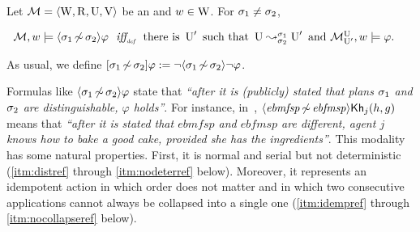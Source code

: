 \medskip


\medskip

\begin{definition}\label{def:ref-sem}
Let $\mathcal{M}=\langle \operatorname{W},\operatorname{R},\operatorname{U},\operatorname{V} \rangle$ be an \ults and $w \in \operatorname{W}$.
For $\sigma_1\neq\sigma_2$,
\begin{spcenter}
$\begin{array}{l@{\ \ }c@{\ \ }l}
\modults,w\models \refdiam{\plan_1}{\plan_2}\varphi & \iffdef & \text{there is } \Unc' \text{ such that } \splitstr{\Unc}{\Unc'}{\plan_1}{\plan_2} \text{ and }  \modults^{\Unc}_{\Unc'},w \models \varphi.
\end{array}$
\end{spcenter}
As usual, we define $[{\sigma_1{\,\not\sim\,}\sigma_2}]\varphi := \lnot \langle \sigma_1{\,\not\sim\,}\sigma_2 \rangle\lnot\varphi$.
\end{definition}

\medskip

Formulas like $\langle \sigma_1{\,\not\sim\,}\sigma_2 \rangle\varphi$ state that \emph{``after it is (publicly) stated that plans $\sigma_1$ and $\sigma_2$ are distinguishable, $\varphi$ holds''}. For instance, in~, $\langle \mathit{ebmfsp}{\,\not\sim\,}\mathit{ebfmsp} \rangle{\sf Kh}_j(h,g)$ means that \emph{``after it is stated that $\mathit{ebmfsp}$ and $\mathit{ebfmsp}$ are different, agent $j$ knows how to bake a good cake, provided she has the ingredients''}. This modality has some natural properties. First, it is normal and serial but not deterministic (\ref{itm:distref} through \ref{itm:nodeterref} below). Moreover, it represents an idempotent action in which order does not matter and in which two consecutive applications cannot always be collapsed into a single one (\ref{itm:idempref} through \ref{itm:nocollapseref} below). 

\medskip

